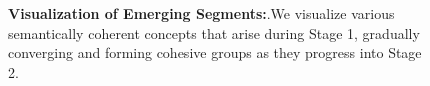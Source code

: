 \begin{figure}[htbp]
  \hfill
  \hfill

  \caption[\textbf{Visualization of Emerging Segments}]{\textbf{Visualization of Emerging Segments:}.We visualize various semantically coherent concepts that arise during Stage 1, gradually converging and forming cohesive groups as they progress into Stage 2.}
  \label{fig:group_vis}
\end{figure}
